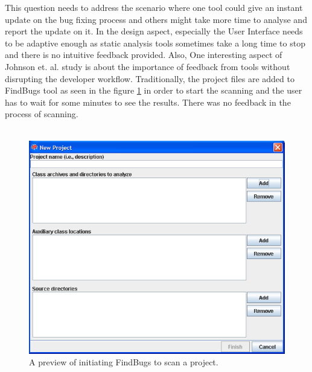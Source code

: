 This question needs to address the scenario where one tool could give an instant update on the bug fixing process and others might take more time to analyse and report the update on it. In the design aspect, especially the User Interface needs to be adaptive \cite{NB18} enough as static analysis tools sometimes take a long time to stop and there is no intuitive feedback provided. Also, One interesting aspect of Johnson et. al. \cite{JSMB13} study is about the importance of feedback from tools without disrupting the developer workflow. Traditionally, the project files are added to FindBugs \cite{findbugs} tool as seen in the figure \ref{fig:findbugs-scan} in order to start the scanning and the user has to wait for some minutes to see the results. There was no feedback in the process of scanning. \\ \\

\begin{figure}[hbt!]
	\centering
	\includegraphics[width=\linewidth]{figures/findbugs-scan}
	\caption{A preview of initiating FindBugs to scan a project.}
	\label{fig:findbugs-scan}
\end{figure}

